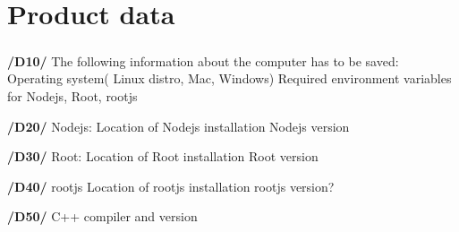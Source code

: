 \chapter{Product data}
\paragraph{}
\textbf{/D10/}
The following information about the computer has to be saved:
Operating system( Linux distro, Mac, Windows)
Required environment variables for Nodejs, Root, rootjs

\textbf{/D20/}
Nodejs:
Location of Nodejs installation
Nodejs version

\textbf{/D30/}
Root:
Location of Root installation
Root version

\textbf{/D40/}
rootjs
Location of rootjs installation
rootjs version?

\textbf{/D50/}
C++ compiler and version

